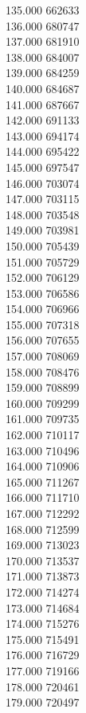 { 135.000	662633 \\
 136.000	680747 \\
 137.000	681910 \\
 138.000	684007 \\
 139.000	684259 \\
 140.000	684687 \\
 141.000	687667 \\
 142.000	691133 \\
 143.000	694174 \\
 144.000	695422 \\
 145.000	697547 \\
 146.000	703074 \\
 147.000	703115 \\
 148.000	703548 \\
 149.000	703981 \\
 150.000	705439 \\
 151.000	705729 \\
 152.000	706129 \\
 153.000	706586 \\
 154.000	706966 \\
 155.000	707318 \\
 156.000	707655 \\
 157.000	708069 \\
 158.000	708476 \\
 159.000	708899 \\
 160.000	709299 \\
 161.000	709735 \\
 162.000	710117 \\
 163.000	710496 \\
 164.000	710906 \\
 165.000	711267 \\
 166.000	711710 \\
 167.000	712292 \\
 168.000	712599 \\
 169.000	713023 \\
 170.000	713537 \\
 171.000	713873 \\
 172.000	714274 \\
 173.000	714684 \\
 174.000	715276 \\
 175.000	715491 \\
 176.000	716729 \\
 177.000	719166 \\
 178.000	720461 \\
 179.000	720497 \\
}
